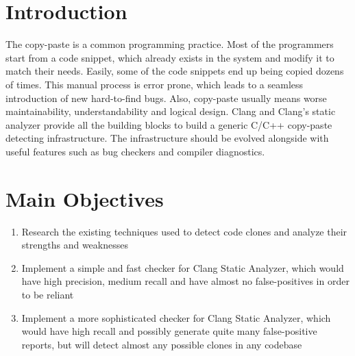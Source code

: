 \documentclass[a0,portrait]{a0poster}
\begin{document}
\vspace{1cm} %


\begin{multicols}{2} %


\color{SaddleBrown} %

\section*{Introduction}

The copy-paste is a common programming practice. Most of the programmers start from a code snippet, which already exists in the system and modify it to match their needs. Easily, some of the code snippets end up being copied dozens of times. This manual process is error prone, which leads to a seamless introduction of new hard-to-find bugs. Also, copy-paste usually means worse maintainability, understandability and logical design. Clang and Clang's static analyzer provide all the building blocks to build a generic C/C++ copy-paste detecting infrastructure. The infrastructure should be evolved alongside with useful features such as bug checkers and compiler diagnostics.


\color{Black} %

\section*{Main Objectives}

\begin{enumerate}
\item Research the existing techniques used to detect code clones and analyze their strengths and
weaknesses
\item Implement a simple and fast checker for Clang Static Analyzer, which would have high precision, medium recall and have almost no false-positives in order to be reliant
\item Implement a more sophisticated checker for Clang Static Analyzer, which would have high recall
and possibly generate quite many false-positive reports, but will detect almost any possible clones 
in any codebase
\end{enumerate}


\end{multicols}
\end{document}
